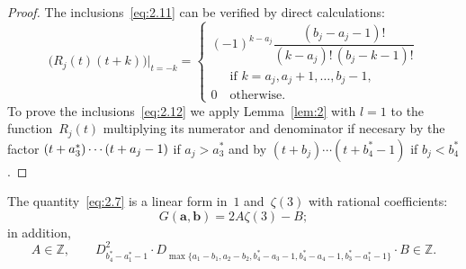 \documentclass[a4paper,twoside]{article}
\numberwithin{equation}{section}
\renewcommand{\[}{\lfloor}
\renewcommand{\]}{\rfloor}
\newcommand{\<}{\langle}
\renewcommand{\>}{\rangle}
\newcommand{\rom}[1]{{\rm#1}}
\newcommand{\ba}{\boldsymbol a}
\newcommand{\bb}{\boldsymbol b}
\begin{document}
\begin{proof}
The inclusions~\eqref{eq:2.11} can be verified by direct calculations:
$$
\bigl(R_j(t)(t+k)\bigr)\big|_{t=-k}=\begin{cases}
(-1)^{k-a_j}\dfrac{(b_j-a_j-1)!}{(k-a_j)!\,(b_j-k-1)!}
\\ \phantom0\quad
\mbox{if $k=a_j,a_j+1,\dots,b_j-1$},
\\
0 \quad\mbox{otherwise}.
\end{cases}
$$
To prove the inclusions~\eqref{eq:2.12}
we apply Lemma~\ref{lem:2} with $l=1$
to the function~$R_j(t)$ multiplying its numerator and denominator
if necesary by the factor
$(t+a_3^*)\dotsb\linebreak[2](t+a_j-1)$
if $a_j>a_3^*$ and by
$(t+b_j)\dotsb(t+b_4^*-1)$ if $b_j<b_4^*$.
\end{proof}

\begin{lemma}
\label{lem:4}
The quantity~\eqref{eq:2.7} is a linear form in~$1$ and~$\zeta(3)$
with rational coefficients\rom:
\begin{equation}
G(\ba,\bb)=2A\zeta(3)-B;
\label{eq:2.13}
\end{equation}
in addition\rom,
\begin{equation}
A\in\mathbb Z, \qquad
D_{b_4^*-a_1^*-1}^2
\cdot D_{\max\{a_1-b_1,a_2-b_2,b_4^*-a_3-1,b_4^*-a_4-1,b_3^*-a_1^*-1\}}
\cdot B\in\mathbb Z.
\label{eq:2.14}
\end{equation}
\end{lemma}
\end{document}
